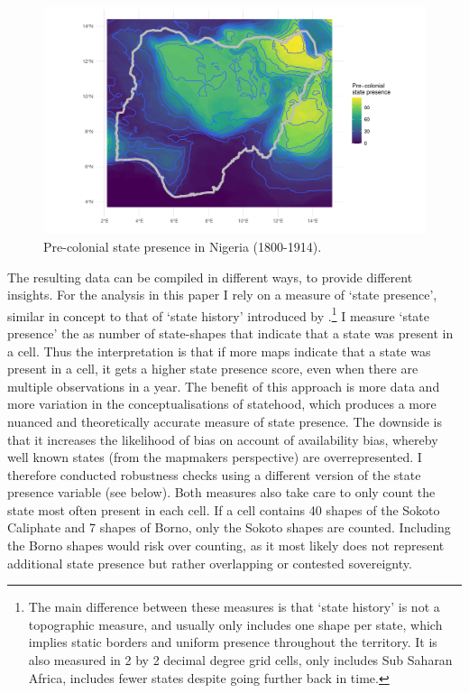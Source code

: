 \documentclass[12pt]{article}
\begin{document}
\begin{figure}[htpb]
	\centering
	\includegraphics[width=\textwidth]{../R/Output/nigeria.pdf}
	\caption{Pre-colonial state presence in Nigeria (1800-1914).}
	\label{nigeria}
\end{figure}


The resulting data can be compiled in different ways, to provide different
insights. For the analysis in this paper I rely on a measure of `state
presence', similar in concept to that of `state history' introduced by
\citet{Depetris-Chauvin2016}.\footnote{The main difference between these
	measures is that `state history' is not a topographic measure, and
	usually only includes one shape per state, which implies static borders
	and uniform presence throughout the territory. It is also measured in 2
by 2 decimal degree grid cells, only includes Sub Saharan Africa, includes fewer
states despite going further back in time.} I measure `state presence' the as
number of state-shapes that indicate that a state was present in a cell. Thus
the interpretation is that if more maps indicate that a state was present in a
cell, it gets a higher state presence score, even when there are multiple
observations in a year. The benefit of this approach is more data and more
variation in the conceptualisations of statehood, which produces a more nuanced
and theoretically accurate measure of state presence. The downside is that it
increases the likelihood of bias on account of availability bias, whereby well
known states (from the mapmakers perspective) are overrepresented. I therefore
conducted robustness checks using a different version of the state presence
variable (see below). Both measures also take care to only count the state most
often present in each cell. If a cell contains 40 shapes of the Sokoto Caliphate
and 7 shapes of Borno, only the Sokoto shapes are counted. Including the Borno
shapes would risk over counting, as it most likely does not represent additional
state presence but rather overlapping or contested sovereignty. 
\end{document}
